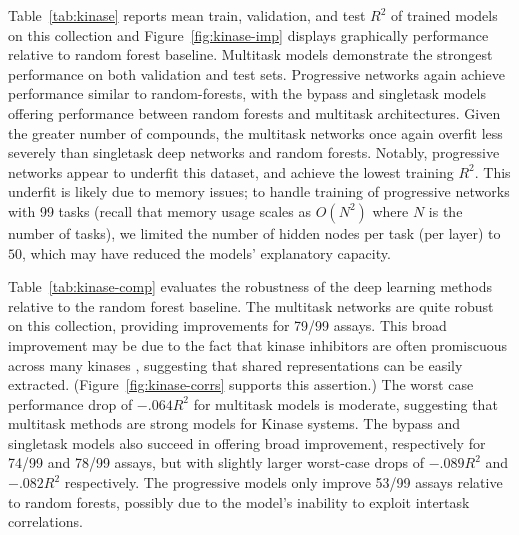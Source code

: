 Table~\ref{tab:kinase} reports mean train, validation, and test $R^2$ of trained models on this collection and Figure~\ref{fig:kinase-imp} displays graphically performance relative to random forest baseline. Multitask models demonstrate the strongest performance on both validation and test sets. Progressive networks again achieve performance similar to random-forests, with the bypass and singletask models offering performance between random forests and multitask architectures. Given the greater number of compounds, the multitask networks once again overfit less severely than singletask deep networks and random forests. Notably, progressive networks appear to underfit this dataset, and achieve the lowest training $R^2$. This underfit is likely due to memory issues; to handle training of progressive networks with 99 tasks (recall that memory usage scales as $O(N^2)$ where $N$ is the number of tasks), we limited the number of hidden nodes per task (per layer) to $50$, which may have reduced the models' explanatory capacity.

Table~\ref{tab:kinase-comp} evaluates the robustness of the deep learning methods relative to the random forest baseline. The multitask networks are quite robust on this collection, providing improvements for 79/99 assays. This broad improvement may be due to the fact that kinase inhibitors are often promiscuous across many kinases \cite{anastassiadis2011comprehensive}, suggesting that shared representations can be easily extracted. (Figure~\ref{fig:kinase-corrs} supports this assertion.) The worst case performance drop of $-.064 R^2$ for multitask models is moderate, suggesting that multitask methods are strong models for Kinase systems. The bypass and singletask models also succeed in offering broad improvement, respectively for 74/99 and 78/99 assays, but with slightly larger worst-case drops of $-.089 R^2$ and $-.082 R^2$ respectively. The progressive models only improve 53/99 assays relative to random forests, possibly due to the model's inability to exploit intertask correlations.


